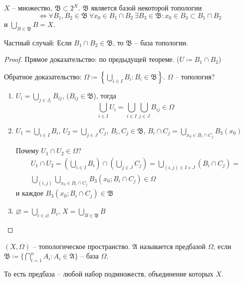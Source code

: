 \documentclass[main]{subfiles}
\begin{document}
\begin{theorem}
    $X$ -- множество, $\mathfrak{B} \subset 2^X$. $\mathfrak{B}$ является базой некоторой топологии
    \[\Leftrightarrow \forall B_1, B_2 \in \mathfrak{B}\ \forall x_0 \in B_1 \cap B_2\ \exists B_3 \in \mathfrak{B}: x_0 \in B_3 \subset B_1 \cap B_2\]
    и $\bigcup_{B \in \mathfrak{B}} B = X$.
\end{theorem}
\begin{remark}
    Частный случай: Если $B_1 \cap B_2 \in \mathfrak{B}$, то $\mathfrak{B}$ -- база топологии.
\end{remark}
\begin{proof}
    Прямое доказательство: по предыдущей теореме. ($U \coloneqq B_1 \cap B_2$)

    Обратное доказательство: $\Omega \coloneqq \left\{\bigcup_{i \in I} B_i: B_i \in \mathfrak{B}\right\}$.
    $\Omega$ -- топология?
    \begin{enumerate}
        \item $U_i = \bigcup_{j \in J_i} B_{ij}$, ($B_{ij} \in \mathfrak{B}$), тогда
              \[\bigcup_{i \in I} U_i = \bigcup_{i \in I} \bigcup_{j \in J} B_{ij} \in \Omega\]
        \item $U_1 = \bigcup_{i \in I} B_i$, $U_2 = \bigcup_{j \in J} C_j$, $B_i, C_j \in \mathfrak{B}$, $B_i \cap C_j = \bigcup_{x_0 \in B_i \cap C_j} B_3 (x_0)$

              Почему $U_1 \cap U_2 \in \Omega$?
              \begin{multline*}
                  U_1 \cap U_2 = \left(\bigcup_{i \in I} B_i\right) \cap \left(\bigcup_{j \in J} C_j\right) = \bigcup_{(i,j) \in I \times J} (B_i \cap C_j) = \\
                  \bigcup_{(i,j)} \bigcup_{x_0 \in B_i \cap C_j} B_3 (x_0; B_i \cap C_j) \in \Omega
              \end{multline*}
              и каждое $B_3 (x_0; B_i \cap C_j) \in \mathfrak{B}$
        \item $\varnothing = \bigcup_{i \in \varnothing} B_i$, $X = \bigcup_{B \in \mathfrak{B}} B$
    \end{enumerate}
\end{proof}

\begin{definition}
    $(X, \Omega)$ -- топологическое пространство. $\mathfrak{A}$ называется предбазой $\Omega$, если
    $\mathfrak{B} \coloneqq \{\bigcap_{i = 1}^n A_i : A_i \in \mathfrak{A}\}$ -- база $\Omega$.

    То есть предбаза -- любой набор подмножеств, объединение которых $X$.
\end{definition}
\end{document}
